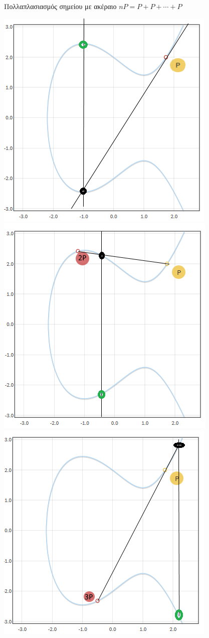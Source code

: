 \documentclass[handout]{beamer}
\begin{document}
\begin{frame}{Πολλαπλασιασμός σημείου με ακέραιο $nP = P + P + \cdots + P$}

\begin{center}
\includegraphics[scale=0.33]{p.png} 
\pause
\includegraphics[scale=0.46]{2p.png} \\
\pause
\includegraphics[scale=0.46]{3p.png} 

\end{center}
\end{frame}
\end{document}
